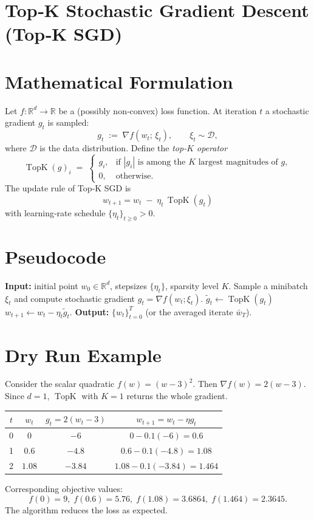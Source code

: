\documentclass{article}
\newcommand{\TopK}{\operatorname{TopK}}
\newcommand{\R}{\mathbb{R}}
\begin{document}
\section*{Top‑K Stochastic Gradient Descent (Top‑K SGD)}

\section*{Mathematical Formulation}
Let $f:\R^{d}\rightarrow\R$ be a (possibly non‑convex) loss function.  
At iteration $t$ a stochastic gradient $g_t$ is sampled:
\[
g_t \;:=\; \nabla f(w_t;\,\xi_t),\qquad \xi_t\sim\mathcal{D},
\]
where $\mathcal{D}$ is the data distribution.  
Define the \emph{top‑$K$ operator}
\[
\TopK(g)_i \;=\;
\begin{cases}
g_i, & \text{if }|g_i|\text{ is among the $K$ largest magnitudes of }g,\\[2mm]
0,   & \text{otherwise.}
\end{cases}
\]
The update rule of Top‑K SGD is
\[
\boxed{w_{t+1}=w_t\;-\;\eta_t\,\TopK(g_t)} \tag{1}
\]
with learning‑rate schedule $\{\eta_t\}_{t\ge 0}>0$.

\section*{Pseudocode}
\begin{algorithm}[H]
\caption{Top‑K SGD}
\begin{algorithmic}[1]
\State \textbf{Input:} initial point $w_0\in\R^d$, stepsizes $\{\eta_t\}$, sparsity level $K$.
    \State Sample a minibatch $\xi_t$ and compute stochastic gradient $g_t=\nabla f(w_t;\xi_t)$.
    \State $\displaystyle \tilde g_t\gets \TopK(g_t)$ 
    \State $w_{t+1}\gets w_t-\eta_t\tilde g_t$.
\EndFor
\State \textbf{Output:} $\{w_t\}_{t=0}^{T}$ (or the averaged iterate $\bar w_T$).
\end{algorithmic}
\end{algorithm}

\section*{Dry Run Example}
Consider the scalar quadratic $f(w)=(w-3)^2$.  
Then $\nabla f(w)=2(w-3)$.  Since $d=1$, $\TopK$ with $K=1$ returns the whole gradient.

\begin{center}
\begin{tabular}{c|c|c|c}
$t$ & $w_t$ & $g_t=2(w_t-3)$ & $w_{t+1}=w_t-\eta g_t$ \\ \hline
0 & $0$ & $-6$ & $0-0.1(-6)=0.6$ \\[2mm]
1 & $0.6$ & $-4.8$ & $0.6-0.1(-4.8)=1.08$ \\[2mm]
2 & $1.08$ & $-3.84$ & $1.08-0.1(-3.84)=1.464$ 
\end{tabular}
\end{center}
Corresponding objective values:
\[
f(0)=9,\; f(0.6)=5.76,\; f(1.08)=3.6864,\; f(1.464)=2.3645.
\]
The algorithm reduces the loss as expected.
\end{document}
